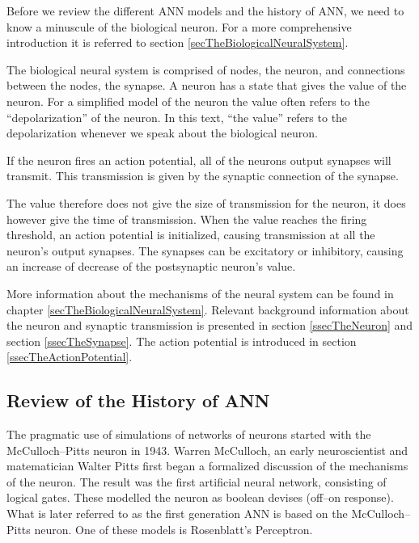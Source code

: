 Before we review the different ANN models and the history of ANN, we need to know a minuscule of the biological neuron. For a more comprehensive introduction it is referred to section \ref{secTheBiologicalNeuralSystem}.

The biological neural system is comprised of nodes, the neuron, and connections between the nodes, the synapse.
A neuron has a state that gives the value of the neuron. 
For a simplified model of the neuron the value often refers to the ``depolarization'' of the neuron. %
In this text, ``the value'' refers to the depolarization whenever we speak about the biological neuron.

If the neuron fires an action potential, all of the neurons output synapses will transmit. 
This transmission is given by the synaptic connection of the synapse.

The value therefore does not give the size of transmission for the neuron, it does however give the time of transmission.
When the value reaches the firing threshold, an action potential is initialized, causing transmission at all the neuron's output synapses.
The synapses can be excitatory or inhibitory, causing an increase of decrease of the postsynaptic neuron's value.

More information about the mechanisms of the neural system can be found in chapter \ref{secTheBiologicalNeuralSystem}. 
Relevant background information about the neuron and synaptic transmission is presented in section \ref{ssecTheNeuron} and section \ref{ssecTheSynapse}. 
The action potential is introduced in section \ref{ssecTheActionPotential}.


\subsection{Review of the History of ANN}
The pragmatic use of simulations of networks of neurons started with the McCulloch--Pitts neuron in 1943. 
Warren McCulloch, an early neuroscientist and matematician Walter Pitts first began a formalized discussion of the mechanisms of the neuron.
The result was the first artificial neural network, consisting of logical gates. These modelled the neuron as boolean devises (off--on response)\cite{MccullochPittsHistorie}. %
What is later referred to as the first generation ANN is based on the McCulloch--Pitts neuron\cite{Maass97networksof}.
One of these models is Rosenblatt's Perceptron\cite{HaykinANNbok}.%

